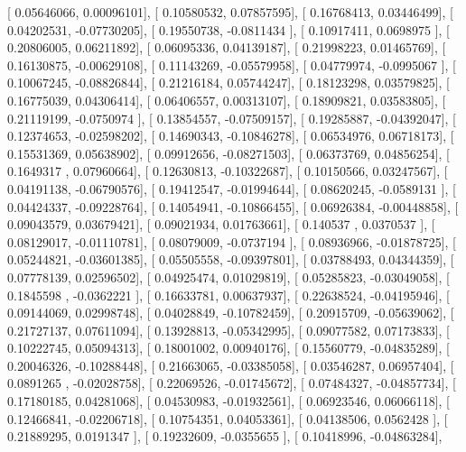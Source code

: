 \documentclass{article}
\begin{document}
       [ 0.05646066,  0.00096101],
       [ 0.10580532,  0.07857595],
       [ 0.16768413,  0.03446499],
       [ 0.04202531, -0.07730205],
       [ 0.19550738, -0.0811434 ],
       [ 0.10917411,  0.0698975 ],
       [ 0.20806005,  0.06211892],
       [ 0.06095336,  0.04139187],
       [ 0.21998223,  0.01465769],
       [ 0.16130875, -0.00629108],
       [ 0.11143269, -0.05579958],
       [ 0.04779974, -0.0995067 ],
       [ 0.10067245, -0.08826844],
       [ 0.21216184,  0.05744247],
       [ 0.18123298,  0.03579825],
       [ 0.16775039,  0.04306414],
       [ 0.06406557,  0.00313107],
       [ 0.18909821,  0.03583805],
       [ 0.21119199, -0.0750974 ],
       [ 0.13854557, -0.07509157],
       [ 0.19285887, -0.04392047],
       [ 0.12374653, -0.02598202],
       [ 0.14690343, -0.10846278],
       [ 0.06534976,  0.06718173],
       [ 0.15531369,  0.05638902],
       [ 0.09912656, -0.08271503],
       [ 0.06373769,  0.04856254],
       [ 0.1649317 ,  0.07960664],
       [ 0.12630813, -0.10322687],
       [ 0.10150566,  0.03247567],
       [ 0.04191138, -0.06790576],
       [ 0.19412547, -0.01994644],
       [ 0.08620245, -0.0589131 ],
       [ 0.04424337, -0.09228764],
       [ 0.14054941, -0.10866455],
       [ 0.06926384, -0.00448858],
       [ 0.09043579,  0.03679421],
       [ 0.09021934,  0.01763661],
       [ 0.140537  ,  0.0370537 ],
       [ 0.08129017, -0.01110781],
       [ 0.08079009, -0.0737194 ],
       [ 0.08936966, -0.01878725],
       [ 0.05244821, -0.03601385],
       [ 0.05505558, -0.09397801],
       [ 0.03788493,  0.04344359],
       [ 0.07778139,  0.02596502],
       [ 0.04925474,  0.01029819],
       [ 0.05285823, -0.03049058],
       [ 0.1845598 , -0.0362221 ],
       [ 0.16633781,  0.00637937],
       [ 0.22638524, -0.04195946],
       [ 0.09144069,  0.02998748],
       [ 0.04028849, -0.10782459],
       [ 0.20915709, -0.05639062],
       [ 0.21727137,  0.07611094],
       [ 0.13928813, -0.05342995],
       [ 0.09077582,  0.07173833],
       [ 0.10222745,  0.05094313],
       [ 0.18001002,  0.00940176],
       [ 0.15560779, -0.04835289],
       [ 0.20046326, -0.10288448],
       [ 0.21663065, -0.03385058],
       [ 0.03546287,  0.06957404],
       [ 0.0891265 , -0.02028758],
       [ 0.22069526, -0.01745672],
       [ 0.07484327, -0.04857734],
       [ 0.17180185,  0.04281068],
       [ 0.04530983, -0.01932561],
       [ 0.06923546,  0.06066118],
       [ 0.12466841, -0.02206718],
       [ 0.10754351,  0.04053361],
       [ 0.04138506,  0.0562428 ],
       [ 0.21889295,  0.0191347 ],
       [ 0.19232609, -0.0355655 ],
       [ 0.10418996, -0.04863284],
\end{document}
